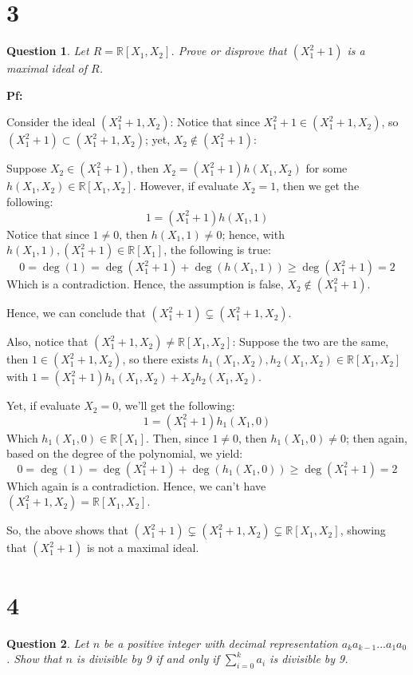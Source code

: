 \documentclass{article}
\newtheorem{question}{Question}
\begin{document}
\break

\section*{3}
\begin{myBox}[]{}
    \begin{question}
        Let $R = \mathbb{R}[X_1, X_2]$. Prove or disprove that $(X_1^2+1)$ is a maximal ideal of $R$.
    \end{question}
\end{myBox}

\textbf{Pf:}

Consider the ideal $(X_1^2+1,X_2)$: Notice that since $X_1^2+1\in (X_1^2+1,X_2)$, so $(X_1^2+1)\subset (X_1^2+1,X_2)$;
yet, $X_2\notin (X_1^2+1)$:

Suppose $X_2\in (X_1^2+1)$, then $X_2=(X_1^2+1)h(X_1,X_2)$ for some $h(X_1,X_2)\in \mathbb{R}[X_1,X_2]$.
However, if evaluate $X_2=1$, then we get the following:
$$1=(X_1^2+1)h(X_1,1)$$
Notice that since $1\neq 0$, then $h(X_1,1)\neq 0$; hence, with $h(X_1,1), (X_1^2+1)\in \mathbb{R}[X_1]$, the following is true:
$$0=\deg(1)=\deg(X_1^2+1)+\deg(h(X_1,1))\geq \deg(X_1^2+1) = 2$$ 
Which is a contradiction. Hence, the assumption is false, $X_2\notin (X_1^2+1)$.

Hence, we can conclude that $(X_1^2+1)\subsetneq (X_1^2+1,X_2)$.

\hfill

\hfill

Also, notice that $(X_1^2+1,X_2)\neq \mathbb{R}[X_1,X_2]$: Suppose the two are the same, then $1\in (X_1^2+1,X_2)$, 
so there exists $h_1(X_1,X_2), h_2(X_1,X_2)\in \mathbb{R}[X_1,X_2]$ with $1=(X_1^2+1)h_1(X_1,X_2)+X_2h_2(X_1,X_2)$.

Yet, if evaluate $X_2=0$, we'll get the following:
$$1=(X_1^2+1)h_1(X_1,0)$$
Which $h_1(X_1,0)\in \mathbb{R}[X_1]$. Then, since $1\neq 0$, then $h_1(X_1,0)\neq 0$; then again, based on the degree of the polynomial, we yield:
$$0=\deg(1)=\deg(X_1^2+1)+\deg(h_1(X_1,0))\geq \deg(X_1^2+1)=2$$
Which again is a contradiction. Hence, we can't have $(X_1^2+1,X_2)=\mathbb{R}[X_1,X_2]$.

\hfill

So, the above shows that $(X_1^2+1)\subsetneq (X_1^2+1,X_2)\subsetneq \mathbb{R}[X_1,X_2]$, showing that $(X_1^2+1)$ is not a maximal ideal.

\break

\section*{4}
\begin{myBox}[]{}
    \begin{question}
        Let $n$ be a positive integer with decimal representation $a_ka_{k-1}...a_1a_0$. Show that $n$ is
divisible by 9 if and only if $\sum_{i=0}^{k}a_i$ is divisible by 9.
    \end{question}
\end{myBox}
\end{document}
